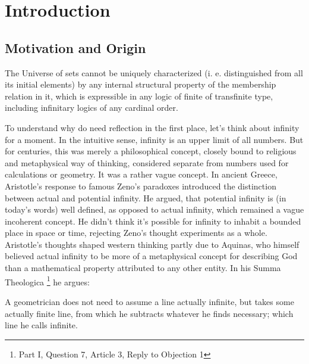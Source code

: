 \documentclass[12pt,a4paper]{article}
\begin{document}
\section{Introduction}\label{sec:vr}

\subsection{Motivation and Origin}
\begin{displayquote}
The Universe of sets cannot be uniquely characterized (i. e. distinguished from all its initial elements) by any internal structural property of the membership relation in it, which is expressible in any logic of finite of transfinite type, including infinitary logics of any cardinal order.
\end{displayquote}

To understand why do need reflection in the first place, let's think about infinity for a moment. In the intuitive sense, infinity is an upper limit of all numbers. But for centuries, this was merely a philosophical concept, closely bound to religious and metaphysical way of thinking, 
considered separate from numbers used for calculations or geometry. It was a rather vague concept. 
In ancient Greece, Aristotle's response to famous Zeno's paradoxes introduced the distinction between actual and potential infinity.
He argued, that potential infinity is (in today's words) well defined, as opposed to actual infinity, which remained a vague incoherent concept. He didn't think it's possible for infinity to inhabit a bounded place in space or time, rejecting Zeno's thought experiments as a whole. 
Aristotle's thoughts shaped western thinking partly due to Aquinas, who himself believed actual infinity to be more of a metaphysical concept for describing God than a mathematical property attributed to any other entity. In his Summa Theologica \footnote{Part I, Question 7, Article 3, Reply to Objection 1} he argues:
\begin{displayquote}
A geometrician does not need to assume a line actually infinite, but takes some actually finite line, from which he subtracts whatever he finds necessary; which line he calls infinite.
\end{displayquote} %
\end{document}
